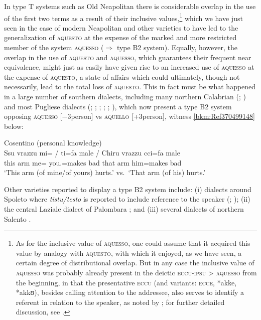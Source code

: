 \documentclass[output=paper]{langsci/langscibook}
\begin{document}
In type T systems such as Old Neapolitan there is considerable overlap
in the use of the first two terms as a result of their inclusive
values,\footnote{As for the inclusive value of \textsc{aquesso}, one could
assume that it acquired this value by analogy with \textsc{aquesto}, with which
it enjoyed, as we have seen, a certain degree of distributional overlap. But in
any case the inclusive value of \textsc{aquesso} was probably already present
in the deictic \textsc{eccu-ipsu} > \textsc{aquesso} from the beginning, in
that the presentative \textsc{eccu} (and variants: \textsc{ecce}, *akke,
*akkʊ), besides calling attention to the addressee, also serves to identify a
referent in relation to the speaker, as noted by \citet[279]{Anderson:1985a};
for further detailed discussion, see \citet[78--87]{ledgeway2004sviluppo}.}
which we have just seen in the case of modern Neapolitan and other varieties to
have led to the generalization of \textsc{aquesto} at the expense of the marked
and more restricted member of the system \textsc{aquesso} (${\Rightarrow}$ type
B2 system). Equally, however, the overlap in the use of \textsc{aquesto}
and \textsc{aquesso}, which guarantees their frequent near equivalence, might
just as easily have given rise to an increased use of \textsc{aquesso} at the
expense of \textsc{aquesto}, a state of affairs which could ultimately, though
not necessarily, lead to the total loss of \textsc{aquesto}. This in fact must
be what happened in a large number of southern dialects, including many
northern Calabrian (\citealt[167]{Rohlfs:1977a};
\citealt[104--107]{ledgeway2004sviluppo}) and most Pugliese dialects
(\citealt[207]{Rohlfs:1968a}; \citealt[27]{Valente:1975a};
\citealt[248]{Loporcaro:1988a}; \citealt[344]{Loporcaro:1997a};
\citealt[129f]{Loporcaro:2009a}; \citealt[107f]{ledgeway2004sviluppo}), which
now present a type B2 system opposing \textsc{aquesso}
[−3person] vs \textsc{aquello} [+3person], witness \eqref{bkm:Ref370499148} below:

\ea\label{bkm:Ref370499148} Cosentino (personal knowledge)\\
    \gll Ssu  vrazzu  mi= / ti=fa  male \textup{\quad /\quad}  Chiru  vrazzu cci=fa  male\\
        this  arm  me= {} you.\Sg{}=makes  bad {} that  arm  him=makes bad\\
    \glt \enquote*{This arm (of mine/of yours) hurts.} vs.\ \enquote*{That arm
        (of his) hurts.}
\z

Other  varieties reported to display a type B2 system
include: (i) dialects around Spoleto where \emph{tistu/testo} is reported to
include reference to the speaker (\citealt[98]{Moretti:1987a};
\citealt[171]{Stavinschi:2009a}); (ii) the central Laziale dialect of Palombara
\citep[140]{Stavinschi:2009a}; and (iii) several dialects of northern Salento
\citep[157, 159]{Mancarella:1998a}.
\end{document}

